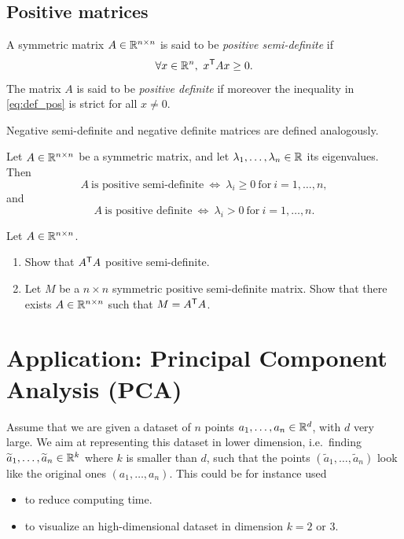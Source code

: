 \documentclass[11pt,nocut]{article}
\begin{document}
\subsection{Positive matrices}

\begin{definition}
	A symmetric matrix $A \in \mathbb{R}^{n \times n}$ is said to be \emph{positive semi-definite} if 
	\begin{equation}\label{eq:def_pos}
		\forall x \in \mathbb{R}^n, \ x^{{\sf T}} A x \geq 0.
	\end{equation}
	The matrix $A$ is said to be \emph{positive definite} if moreover the inequality in \eqref{eq:def_pos} is strict for all $x \neq 0$.
\end{definition}
\begin{remark}
	Negative semi-definite and negative definite matrices are defined analogously.
\end{remark}

\begin{proposition}
	Let $A \in \mathbb{R}^{n \times n}$ be a symmetric matrix, and let $\lambda_1, \dots,\lambda_n \in \mathbb{R}$ its eigenvalues. Then
	$$
	A \ \text{is positive semi-definite} \ \Longleftrightarrow \
	\lambda_i \geq 0 \ \text{for} \ i = 1, \dots, n,
	$$
	and
	$$
	A \ \text{is positive definite} \ \Longleftrightarrow \
	\lambda_i > 0 \ \text{for} \ i = 1, \dots, n.
	$$
\end{proposition}

\begin{exercise}
	Let $A \in \mathbb{R}^{n \times n}$.
	\begin{enumerate}[label=\alph*.]
		\item Show that $A^{{\sf T}} A$ positive semi-definite.
		\item Let $M$ be a $n \times n$ symmetric positive semi-definite matrix. Show that there exists $A \in \mathbb{R}^{n \times n}$ such that $M = A^{{\sf T}} A$.
	\end{enumerate}
\end{exercise}


\section{Application: Principal Component Analysis (PCA)}

Assume that we are given a dataset of $n$ points $a_1, \dots, a_n \in \mathbb{R}^d$, with $d$ very large. We aim at representing this dataset in lower dimension, i.e.\ finding $\widetilde{a}_1, \dots, \widetilde{a}_n \in \mathbb{R}^k$ where $k$ is smaller than $d$, such that the points $(\widetilde{a}_1, \dots, \widetilde{a}_n)$ look like the original ones $(a_1, \dots, a_n)$. This could be for instance used
\begin{itemize}
	\item to reduce computing time.
	\item to visualize an high-dimensional dataset in dimension $k=2$ or 3.
\end{itemize}
\end{document}

